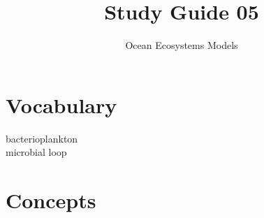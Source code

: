 \documentclass[nofonts, letterpaper]{tufte-handout}
\title{Study Guide 05}
\author{Ocean Ecosystems Models}
\date{} %
\begin{document}
\maketitle	%


\section{Vocabulary}
\vspace{-1\baselineskip}
\begin{multicols}{2}
bacterioplankton \\
microbial loop
\end{multicols}

\section{Concepts}
\end{document}
